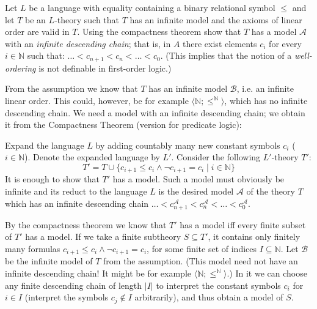 \begin{problem} 
    
    Let $L$ be a language with equality containing a binary relational symbol $\le$ and let $T$ be an $L$-theory such that $T$ has an infinite model and the axioms of linear order are valid in $T$. Using the compactness theorem show that $T$ has a model $\mathcal{A}$ with an \emph{infinite descending chain}; that is, in $A$ there exist elements $c_i$ for every $i\in \mathbb{N}$ such that: $\dots < c_{n+1} < c_n< \dots <c_0$.
    (This implies that the notion of a \emph{well-ordering} is not definable in first-order logic.)

    \begin{solution}

        From the assumption we know that $T$ has an infinite model $\mathcal B$, i.e. an infinite linear order. This could, however, be for example $\langle \mathbb N;\leq^\mathbb N\rangle$, which has no infinite descending chain. We need a model with an infinite descending chain; we obtain it from the Compactness Theorem (version for predicate logic):
                
        Expand the language $L$ by adding countably many new constant symbols $c_i$ ($i\in\mathbb{N}$). Denote the expanded language by $L'$. Consider the following $L'$-theory $T'$:
        $$
        T' = T \cup \{c_{i+1}\leq c_i\land\neg c_{i+1}=c_i\mid i\in\mathbb{N}\}
        $$
        It is enough to show that $T'$ has a model. Such a model must obviously be infinite and its reduct to the language $L$ is the desired model $\mathcal A$ of the theory $T$ which has an infinite descending chain $\dots < c_{n+1}^\mathcal A < c_n^\mathcal A < \dots < c_0^\mathcal A$. 
        
        By the compactness theorem we know that $T'$ has a model iff every finite subset of $T'$ has a model. If we take a finite subtheory $S\subseteq T'$, it contains only finitely many formulas $c_{i+1}\leq c_i\land\neg c_{i+1}=c_i$, for some finite set of indices $I\subseteq\mathbb N$. Let $\mathcal B$ be the infinite model of $T$ from the assumption. (This model need not have an infinite descending chain! It might be for example $\langle \mathbb N;\leq^\mathbb N\rangle$.) In it we can choose any finite descending chain of length $|I|$ to interpret the constant symbols $c_i$ for $i\in I$ (interpret the symbols $c_j\notin I$ arbitrarily), and thus obtain a model of $S$.
                    
    \end{solution}

\end{problem}


